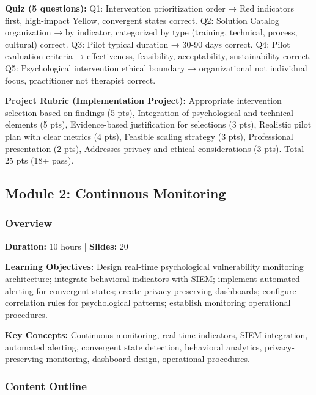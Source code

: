 \documentclass[11pt,a4paper]{article}
\begin{document}
\textbf{Quiz (5 questions):} Q1: Intervention prioritization order → Red indicators first, high-impact Yellow, convergent states correct. Q2: Solution Catalog organization → by indicator, categorized by type (training, technical, process, cultural) correct. Q3: Pilot typical duration → 30-90 days correct. Q4: Pilot evaluation criteria → effectiveness, feasibility, acceptability, sustainability correct. Q5: Psychological intervention ethical boundary → organizational not individual focus, practitioner not therapist correct.

\textbf{Project Rubric (Implementation Project):} Appropriate intervention selection based on findings (5 pts), Integration of psychological and technical elements (5 pts), Evidence-based justification for selections (3 pts), Realistic pilot plan with clear metrics (4 pts), Feasible scaling strategy (3 pts), Professional presentation (2 pts), Addresses privacy and ethical considerations (3 pts). Total 25 pts (18+ pass).

\subsection{Module 2: Continuous Monitoring}

\subsubsection{Overview}

\textbf{Duration:} 10 hours | \textbf{Slides:} 20

\textbf{Learning Objectives:} Design real-time psychological vulnerability monitoring architecture; integrate behavioral indicators with SIEM; implement automated alerting for convergent states; create privacy-preserving dashboards; configure correlation rules for psychological patterns; establish monitoring operational procedures.

\textbf{Key Concepts:} Continuous monitoring, real-time indicators, SIEM integration, automated alerting, convergent state detection, behavioral analytics, privacy-preserving monitoring, dashboard design, operational procedures.

\subsubsection{Content Outline}
\end{document}
